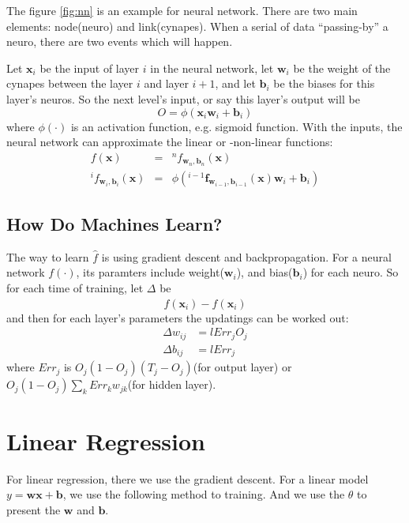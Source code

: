 \documentclass[twoside]{article}
\begin{document}
The figure \ref{fig:nn} is an example for neural network.
There are two main elements: node(neuro) and link(cynapes).
When a serial of data ``passing-by'' a neuro, there are two events which will happen.

Let $\mathbf{x}_i$ be the input of layer $i$ in the neural network, let $\mathbf{w}_i$
be the weight of the cynapes between the layer $i$ and layer $i+1$,
and let $\mathbf{b}_i$ be the biases for this layer's neuros.
So the next level's input, or say this layer's output will be
$$
  O = \phi\left(\mathbf{x}_i\mathbf{w}_i + \mathbf{b}_i\right)
$$
where $\phi(\cdot)$ is an activation function, e.g. sigmoid function.
With the inputs, the neural network can approximate the linear or -non-linear functions:
\begin{equation}
  \label{eq:nn:app}
  \begin{array}{rcl}
  f(\mathbf{x}) &=& ^nf_{\mathbf{w}_n,\mathbf{b}_n}(\mathbf{x}) \\
  {}^if_{\mathbf{w}_i,\mathbf{b}_i}(\mathbf{x}) &=& \phi\left({}^{i-1}\mathbf{f}_{\mathbf{w}_{i-1},\mathbf{b}_{i-1}}(\mathbf{x})\mathbf{w}_i + \mathbf{b}_i\right)
  \end{array}
\end{equation}

\subsection{How Do Machines Learn?}
\label{sec:nn:how}

The way to learn $\hat{f}$ is using gradient descent and backpropagation.
For a neural network $f(\cdot)$, its paramters include weight($\mathbf{w}_i$),
and bias($\mathbf{b}_i$) for each neuro. So for each time of training, 
let $\Delta$ be
$$
 f(\mathbf{x}_i) - \hat{f}(\mathbf{x}_i)
$$
and then for each layer's parameters the updatings can be worked out:
\begin{align*}
  \Delta w_{ij} &= l{Err_jO_j} \\
  \Delta b_{ij} &= l{Err_j}
\end{align*}
where $Err_j$ is $O_j(1-O_j)(T_j-O_j)$(for output layer) or $O_j(1-O_j)\sum\limits_kErr_kw_{jk}$(for hidden layer).


\section{Linear Regression}
\label{sec:lreg}

For linear regression, there we use the gradient descent.
For a linear model $y=\mathbf{w}\mathbf{x}+\mathbf{b}$, we use the following method to training.
And we use the $\theta$ to present the $\mathbf{w}$ and $\mathbf{b}$.
\end{document}
